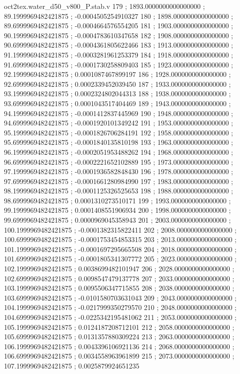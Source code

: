 \begin{filecontents}[overwrite]{oct2tex.water_d50_v800_P.stab.v}
179 ; 1893.0000000000000000 ; 89.1999969482421875 ; -0.0004505254910327
180 ; 1898.0000000000000000 ; 89.6999969482421875 ; -0.0004664576554205
181 ; 1903.0000000000000000 ; 90.1999969482421875 ; -0.0004783610347658
182 ; 1908.0000000000000000 ; 90.6999969482421875 ; -0.0004361805622466
183 ; 1913.0000000000000000 ; 91.1999969482421875 ; -0.0003281961253379
184 ; 1918.0000000000000000 ; 91.6999969482421875 ; -0.0001730258809403
185 ; 1923.0000000000000000 ; 92.1999969482421875 ; 0.0001087467899197
186 ; 1928.0000000000000000 ; 92.6999969482421875 ; 0.0002339452039450
187 ; 1933.0000000000000000 ; 93.1999969482421875 ; 0.0002324802044313
188 ; 1938.0000000000000000 ; 93.6999969482421875 ; 0.0001043517404469
189 ; 1943.0000000000000000 ; 94.1999969482421875 ; -0.0001412837445969
190 ; 1948.0000000000000000 ; 94.6999969482421875 ; -0.0001920101349242
191 ; 1953.0000000000000000 ; 95.1999969482421875 ; -0.0001826706284191
192 ; 1958.0000000000000000 ; 95.6999969482421875 ; -0.0001840135810198
193 ; 1963.0000000000000000 ; 96.1999969482421875 ; -0.0002051953488262
194 ; 1968.0000000000000000 ; 96.6999969482421875 ; -0.0002221652102889
195 ; 1973.0000000000000000 ; 97.1999969482421875 ; -0.0001936582848430
196 ; 1978.0000000000000000 ; 97.6999969482421875 ; -0.0001661280984990
197 ; 1983.0000000000000000 ; 98.1999969482421875 ; -0.0001125326525653
198 ; 1988.0000000000000000 ; 98.6999969482421875 ; 0.0001310273510171
199 ; 1993.0000000000000000 ; 99.1999969482421875 ; 0.0001408551906934
200 ; 1998.0000000000000000 ; 99.6999969482421875 ; 0.0000969045358943
201 ; 2003.0000000000000000 ; 100.1999969482421875 ; -0.0001382315822411
202 ; 2008.0000000000000000 ; 100.6999969482421875 ; -0.0001753454853315
203 ; 2013.0000000000000000 ; 101.1999969482421875 ; -0.0001697295665508
204 ; 2018.0000000000000000 ; 101.6999969482421875 ; -0.0001805341307772
205 ; 2023.0000000000000000 ; 102.1999969482421875 ; 0.0038699482101947
206 ; 2028.0000000000000000 ; 102.6999969482421875 ; 0.0098547479137778
207 ; 2033.0000000000000000 ; 103.1999969482421875 ; 0.0095506347715855
208 ; 2038.0000000000000000 ; 103.6999969482421875 ; -0.0101580703631043
209 ; 2043.0000000000000000 ; 104.1999969482421875 ; -0.0217999350279570
210 ; 2048.0000000000000000 ; 104.6999969482421875 ; -0.0225342195481062
211 ; 2053.0000000000000000 ; 105.1999969482421875 ; 0.0124187208712101
212 ; 2058.0000000000000000 ; 105.6999969482421875 ; 0.0131357880309224
213 ; 2063.0000000000000000 ; 106.1999969482421875 ; 0.0043396106921136
214 ; 2068.0000000000000000 ; 106.6999969482421875 ; 0.0034558963961899
215 ; 2073.0000000000000000 ; 107.1999969482421875 ; 0.0025879924651235

\end{filecontents}
